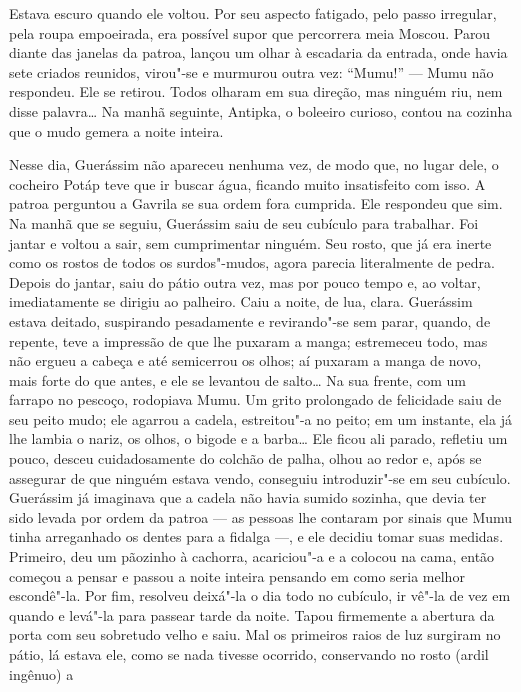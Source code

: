 Estava escuro quando ele voltou. Por seu aspecto fatigado, pelo passo
irregular, pela roupa empoeirada, era possível supor que percorrera meia
Moscou. Parou diante das janelas da patroa, lançou um olhar à escadaria
da entrada, onde havia sete criados reunidos, virou"-se e murmurou outra
vez: ``Mumu!'' --- Mumu não respondeu. Ele se retirou. Todos olharam em
sua direção, mas ninguém riu, nem disse palavra\ldots{} Na manhã seguinte,
Antipka, o boleeiro curioso, contou na cozinha que o mudo gemera a noite
inteira.

Nesse dia, Guerássim não apareceu nenhuma vez, de modo que, no lugar
dele, o cocheiro Potáp teve que ir buscar água, ficando muito
insatisfeito com isso. A patroa perguntou a Gavrila se sua ordem fora
cumprida. Ele respondeu que sim. Na manhã que se seguiu, Guerássim saiu
de seu cubículo para trabalhar. Foi jantar e voltou a sair, sem
cumprimentar ninguém. Seu rosto, que já era inerte como os rostos de todos os
surdos"-mudos, agora parecia literalmente de pedra. Depois do jantar,
saiu do pátio outra vez, mas por pouco tempo e, ao voltar, imediatamente
se dirigiu ao palheiro. Caiu a noite, de lua, clara. Guerássim estava
deitado, suspirando pesadamente e revirando"-se sem parar, quando, de
repente, teve a impressão de que lhe puxaram a manga; estremeceu todo,
mas não ergueu a cabeça e até semicerrou os olhos; aí puxaram a manga de novo,
mais forte do que antes, e ele se levantou de salto\ldots{} Na sua frente,
com um farrapo no pescoço, rodopiava Mumu. Um grito prolongado de
felicidade saiu de seu peito mudo; ele agarrou a cadela, estreitou"-a no
peito; em um instante, ela já lhe lambia o nariz, os olhos, o bigode e a
barba\ldots{} Ele ficou ali parado, refletiu um pouco, desceu cuidadosamente do
colchão de palha, olhou ao redor e, após se assegurar de que ninguém
estava vendo, conseguiu introduzir"-se em seu cubículo. Guerássim já
imaginava que a cadela não havia sumido sozinha, que devia ter sido
levada por ordem da patroa --- as pessoas lhe contaram por sinais que
Mumu tinha arreganhado os dentes para a fidalga ---, e ele decidiu tomar
suas medidas. Primeiro, deu um pãozinho à cachorra, acariciou"-a e a colocou
na cama, então começou a pensar e passou a noite inteira pensando em como seria melhor escondê"-la. Por fim, resolveu deixá"-la o dia todo no
cubículo, ir vê"-la de vez em quando e levá"-la para passear tarde da
noite. Tapou firmemente a abertura da porta com seu sobretudo velho e
saiu. Mal os primeiros raios de luz surgiram no pátio, lá estava ele,
como se nada tivesse ocorrido, conservando no rosto (ardil ingênuo) a
